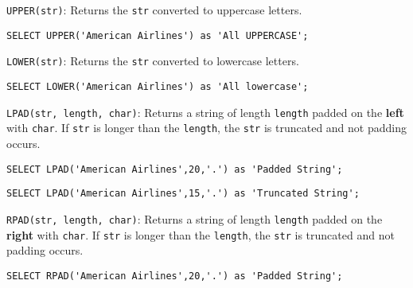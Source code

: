 \documentclass{article}
\begin{document}
\begin{outline}
    
    
   
      
   \1 \texttt{UPPER(str)}: Returns the \texttt{str}
converted to uppercase letters.  
       
\begin{lstlisting}[frame=single]  
SELECT UPPER('American Airlines') as 'All UPPERCASE';
\end{lstlisting}

    
    
    
    
   
      
   \1 \texttt{LOWER(str)}:  Returns the \texttt{str}
converted to lowercase letters.
       
\begin{lstlisting}[frame=single]  
SELECT LOWER('American Airlines') as 'All lowercase';
\end{lstlisting}

    
    
    
    
    
    
   
      
   \1 \texttt{LPAD(str, length, char)}: Returns a string of length \texttt{length} padded on the \textbf{left} with \texttt{char}.  If \texttt{str} is longer than the \texttt{length}, the \texttt{str} is truncated and not padding occurs.      
       
\begin{lstlisting}[frame=single]  
SELECT LPAD('American Airlines',20,'.') as 'Padded String'; 
\end{lstlisting}



   
\begin{lstlisting}[frame=single]  
SELECT LPAD('American Airlines',15,'.') as 'Truncated String'; 
\end{lstlisting}

        
    
    
    
   
      
  \1 \texttt{RPAD(str, length, char)}: Returns a string of length \texttt{length}
padded on the \textbf{right} with \texttt{char}.  If \texttt{str} is longer than the \texttt{length}, the \texttt{str} is truncated and not padding occurs.  
   
       
\begin{lstlisting}[frame=single]  
SELECT RPAD('American Airlines',20,'.') as 'Padded String'; 
\end{lstlisting}


\end{outline}
\end{document}
